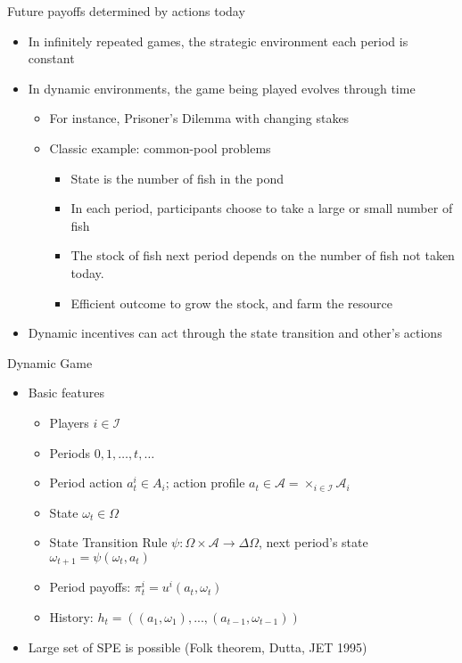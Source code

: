 \documentclass{beamer}
\begin{document}
\begin{frame}{Future payoffs determined by actions today}

\begin{itemize}
\item In infinitely repeated games, the strategic environment each period
is constant
\item In dynamic environments, the game being played evolves through time

\begin{itemize}
\item For instance, Prisoner's Dilemma with changing stakes
\item Classic example: common-pool problems\pause

\begin{itemize}
\item State is the number of fish in the pond
\item In each period, participants choose to take a large or small number
of fish
\item The stock of fish next period depends on the number of fish not taken
today.
\item Efficient outcome to grow the stock, and farm the resource
\end{itemize}
\end{itemize}
\item Dynamic incentives can act through the state transition and other's
actions
\end{itemize}
\end{frame}

\begin{frame}{Dynamic Game}
\begin{itemize}
\item Basic features

\begin{itemize}
\item Players $i\in\mathcal{I}$
\item Periods $0,1,\ldots,t,\ldots$
\item Period action $a_{t}^{i}\in A_{i}$; action profile $a_{t}\in\mathcal{A}=\times_{i\in\mathcal{I}}\mathcal{A}_{i}$\pause
\item State $\omega_{t}\in\Omega$
\item State Transition Rule $\psi:\Omega\times\mathcal{A}\rightarrow\Delta\Omega$,
next period's state $\omega_{t+1}=\psi(\omega_{t},a_{t})$\pause
\item Period payoffs: $\pi_{t}^{i}=u^{i}(a_{t},\omega_{t})$
\item History: $h_{t}=\left((a_{1},\omega_{1}),...,(a_{t-1},\omega_{t-1})\right)$\pause
\end{itemize}
\item Large set of SPE is possible (Folk theorem, Dutta, JET 1995)
\end{itemize}
\end{frame}
\end{document}
